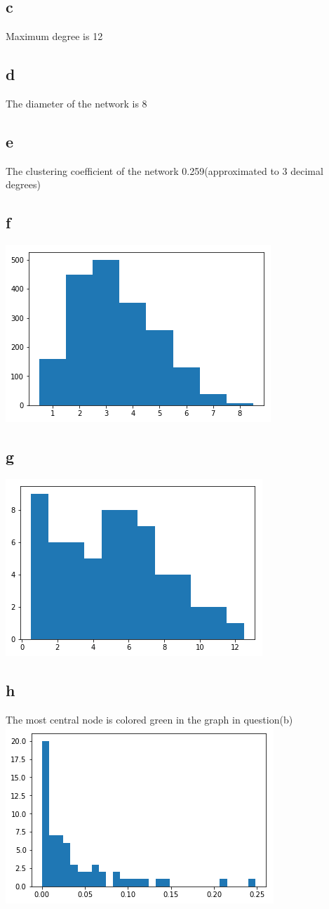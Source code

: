 \documentclass[12pt]{article}
\begin{document}
\subsection*{c} Maximum degree is 12
\subsection*{d} The diameter of the network is 8
\subsection*{e} The clustering coefficient of the network 0.259(approximated to 3 decimal degrees)
\subsection*{f}\includegraphics[scale = 0.7]{12.png}
\subsection*{g}\includegraphics[scale = 0.7]{13.png}
\subsection*{h} The most central node is colored green in the graph in question(b)\\
\includegraphics[scale = 0.7]{14.png}
\end{document}
